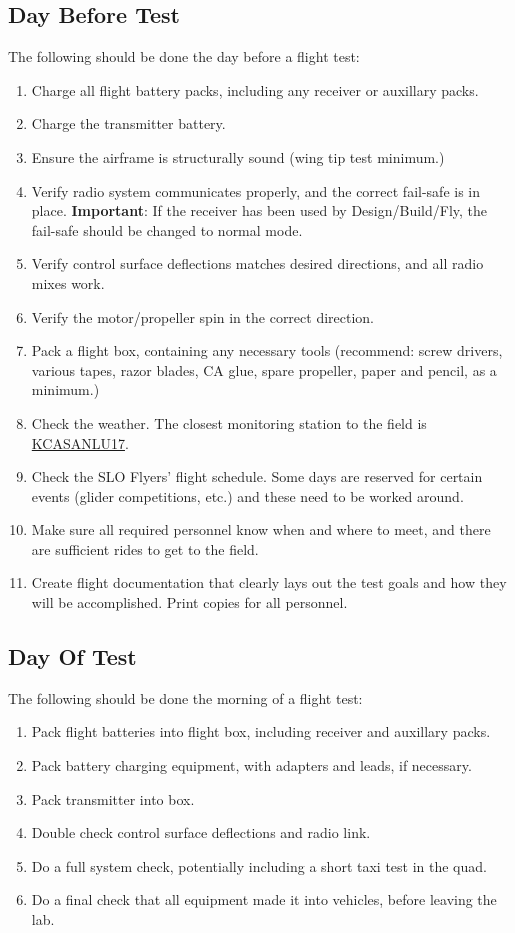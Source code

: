 \subsection{Day Before Test}
The following should be done the day before a flight test:
\begin{enumerate}
\item Charge all flight battery packs, including any receiver or auxillary packs.
\item Charge the transmitter battery.
\item Ensure the airframe is structurally sound (wing tip test minimum.)
\item Verify radio system communicates properly, and the correct fail-safe is in place. \textbf{Important}: If the receiver has been used by Design/Build/Fly, the fail-safe should be changed to normal mode.
\item Verify control surface deflections matches desired directions, and all radio mixes work.
\item Verify the motor/propeller spin in the correct direction.
\item Pack a flight box, containing any necessary tools (recommend: screw drivers, various tapes, razor blades, CA glue, spare propeller, paper and pencil, as a minimum.)
\item Check the weather. The closest monitoring station to the field is \href{http://www.wunderground.com/cgi-bin/findweather/getForecast?query=35.326\%2C-120.738\&sp=KCASANLU17}{KCASANLU17}.
\item Check the SLO Flyers' flight schedule. Some days are reserved for certain events (glider competitions, etc.) and these need to be worked around.
\item Make sure all required personnel know when and where to meet, and there are sufficient rides to get to the field.
\item Create flight documentation that clearly lays out the test goals and how they will be accomplished. Print copies for all personnel.
\end{enumerate}
\subsection{Day Of Test}
The following should be done the morning of a flight test:
\begin{enumerate}
\item Pack flight batteries into flight box, including receiver and auxillary packs.
\item Pack battery charging equipment, with adapters and leads, if necessary.
\item Pack transmitter into box.
\item Double check control surface deflections and radio link.
\item Do a full system check, potentially including a short taxi test in the quad.
\item Do a final check that all equipment made it into vehicles, before leaving the lab.
\end{enumerate}

